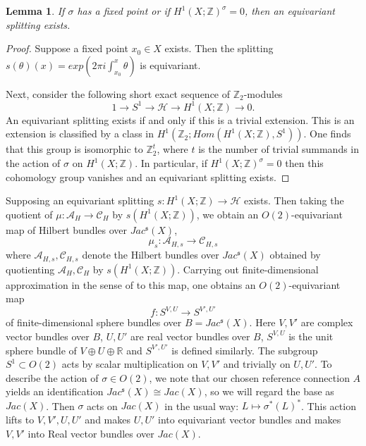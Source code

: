 \documentclass{amsart}
\newtheorem{lemma}[theorem]{Lemma}
\theoremstyle{definition}
\theoremstyle{remark}
\numberwithin{equation}{section}
\begin{document}
\begin{lemma}\label{lem:eqs}
If $\sigma$ has a fixed point or if $H^1(X ; \mathbb{Z})^{\sigma} = 0$, then an equivariant splitting exists.
\end{lemma}
\begin{proof}
Suppose a fixed point $x_0 \in X$ exists. Then the splitting $s(\theta)(x) = exp( 2\pi i \int_{x_0}^x \theta)$ is equivariant.

Next, consider the following short exact sequence of $\mathbb{Z}_2$-modules
\[
1 \to S^1 \to \mathcal{H} \to H^1(X ; \mathbb{Z} ) \to 0.
\]
An equivariant splitting exists if and only if this is a trivial extension. This is an extension is classified by a class in $H^1( \mathbb{Z}_2 ; Hom( H^1(X ; \mathbb{Z}) , S^1) )$. One finds that this group is isomorphic to $\mathbb{Z}_2^t$, where $t$ is the number of trivial summands in the action of $\sigma$ on $H^1(X ; \mathbb{Z})$. In particular, if $H^1( X ; \mathbb{Z})^{\sigma} = 0$ then this cohomology group vanishes and an equivariant splitting exists.
\end{proof}

Supposing an equivariant splitting $s : H^1(X ; \mathbb{Z}) \to \mathcal{H}$ exists. Then taking the quotient of $\mu : \mathcal{A}_H \to \mathcal{C}_H$ by $s(H^1(X ; \mathbb{Z}))$, we obtain an $O(2)$-equivariant map of Hilbert bundles over $Jac^{\mathfrak{s}}(X)$,
\[
\mu_s : \mathcal{A}_{H,s} \to \mathcal{C}_{H,s}
\]
where $\mathcal{A}_{H,s}, \mathcal{C}_{H,s}$ denote the Hilbert bundles over $Jac^{\mathfrak{s}}(X)$ obtained by quotienting $\mathcal{A}_H, \mathcal{C}_H$ by $s(H^1(X ; \mathbb{Z}))$. Carrying out finite-dimensional approximation in the sense of \cite{bf} to this map, one obtains an $O(2)$-equivariant map
\[
f : S^{V,U} \to S^{V',U'}
\]
of finite-dimensional sphere bundles over $B = Jac^{\mathfrak{s}}(X)$. Here $V,V'$ are complex vector bundles over $B$, $U,U'$ are real vector bundles over $B$, $S^{V,U}$ is the unit sphere bundle of $V \oplus U \oplus \mathbb{R}$ and $S^{V',U'}$ is defined similarly. The subgroup $S^1 \subset O(2)$ acts by scalar multiplication on $V,V'$ and trivially on $U,U'$. To describe the action of $\sigma \in O(2)$, we note that our chosen reference connection $A$ yields an identification $Jac^{\mathfrak{s}}(X) \cong Jac(X)$, so we will regard the base as $Jac(X)$. Then $\sigma$ acts on $Jac(X)$ in the usual way: $L \mapsto \sigma^*(L)^*$. This action lifts to $V,V',U,U'$ and makes $U,U'$ into equivariant vector bundles and makes $V,V'$ into Real vector bundles over $Jac(X)$.
\end{document}
